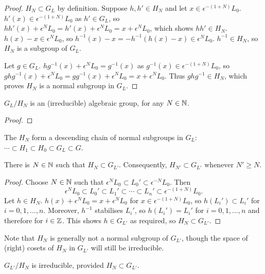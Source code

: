 \documentclass[a4paper, 11pt]{report}
\begin{document}
\begin{proof}
$H_N\subset G_L$ by definition. Suppose $h,h'\in H_N$ and let $x\in\epsilon^{-(1+N)}L_0$. $h'(x)\in\epsilon^{-(1+N)}L_0$ as $h'\in G_L$, so $hh'(x) + \epsilon^N L_0 = h'(x) + \epsilon^N L_0 = x + \epsilon^N L_0$, which shows $hh'\in H_N$. $h(x)-x\in\epsilon^N L_0$, so $h^{-1}(x) - x = -h^{-1}(h(x)-x)\in\epsilon^N L_0$. $h^{-1}\in H_N$, so $H_N$ is a subgroup of $G_L$.

Let $g\in G_L$. $hg^{-1}(x) + \epsilon^N L_0 = g^{-1}(x)$ as $g^{-1}(x)\in\epsilon^{-(1+N)}L_0$, so $ghg^{-1}(x) + \epsilon^N L_0 = gg^{-1}(x) + \epsilon^N L_0 = x + \epsilon^N L_0$. Thus $ghg^{-1}\in H_N$, which proves $H_N$ is a normal subgroup in $G_L$.
\end{proof}

\begin{lemma}
$G_L/H_N$ is an (irreducible) algebraic group, for any $N\in\mathbb{N}$.
\end{lemma}

\begin{proof}
\finishproof
\end{proof}

The $H_N$ form a descending chain of normal subgroups in $G_L$: $\cdots\subset H_1 \subset H_0 \subset G_L \subset G$.

\begin{lemma}
There is $N\in\mathbb{N}$ such that $H_N\subset G_{L'}$. Consequently, $H_{N'}\subset G_{L'}$ whenever $N'\geq N$.
\end{lemma}

\begin{proof}
Choose $N\in\mathbb{N}$ such that $\epsilon^N L_0\subset L_0'\subset \epsilon^{-N}L_0$. Then
\begin{equation*}
\epsilon^N L_0 \subset L_0'\subset L_1'\subset\cdots\subset L_n' \subset \epsilon^{-(1+N)}L_0.
\end{equation*}
Let $h\in H_N$. $h(x) + \epsilon^N L_0 = x + \epsilon^N L_0$ for $x\in\epsilon^{-(1+N)} L_0$, so $h(L_i')\subset L_i'$ for $i=0,1,\ldots,n$. Moreover, $h^{-1}$ stabilises $L_i'$, so $h(L_i') = L_i'$ for $i=0,1,\ldots,n$ and therefore for $i\in\mathbb{Z}$. This shows $h\in G_{L'}$ as required, so $H_N\subset G_{L'}$.
\end{proof}

Note that $H_N$ is generally not a normal subgroup of $G_{L'}$, though the space of (right) cosets of $H_N$ in $G_{L'}$ will still be irreducible.

\begin{lemma}
$G_{L'}/H_N$ is irreducible, provided $H_N\subset G_{L'}$.
\end{lemma}
\end{document}
